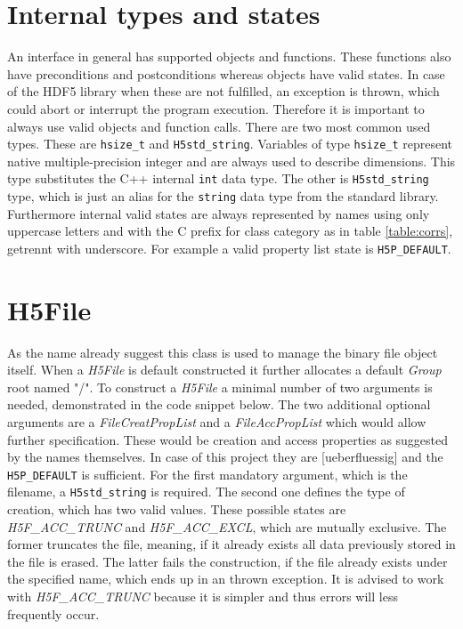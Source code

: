 \section{Internal types and states}
\label{seq:internaltypes}
An interface in general has supported objects and functions. These functions also have preconditions and postconditions whereas objects have valid states. In case of the HDF5 library when these are not fulfilled, an exception is thrown, which could abort or interrupt the program execution. Therefore it is important to always use valid objects and function calls. There are two most common used types. These are \texttt{hsize\_t} and \texttt{H5std\_string}. Variables of type \texttt{hsize\_t} represent native multiple-precision integer and are always used to describe dimensions. This type substitutes the C++ internal \texttt{int} data type. The other is \texttt{H5std\_string} type, which is just an alias for the \texttt{string} data type from the standard library. Furthermore internal valid states are always represented by names using only uppercase letters and with the C prefix for class category as in table \ref{table:corrs}, getrennt with underscore. For example a valid property list state is \texttt{H5P\_DEFAULT}.

\section{H5File}
\label{seq:h5file}
As the name already suggest this class is used to manage the binary file object itself. When a \textit{H5File} is default constructed it further allocates a default \textit{Group} root named "/". To construct a \textit{H5File} a minimal number of two arguments is needed, demonstrated in the code snippet below. The two additional optional arguments are a \textit{FileCreatPropList} and a \textit{FileAccPropList} which would allow further specification. These would be creation and access properties as suggested by the names themselves. In case of this project they are [ueberfluessig] and the \texttt{H5P\_DEFAULT} is sufficient. For the first mandatory argument, which is the filename, a \texttt{H5std\_string} is required. The second one defines the type of creation, which has two valid values. These possible states are \textit{H5F\_ACC\_TRUNC} and \textit{H5F\_ACC\_EXCL}, which are mutually exclusive. The former truncates the file, meaning, if it already exists all data previously stored in the file is erased. The latter fails the construction, if the file already exists under the specified name, which ends up in an thrown exception. It is advised to work with \textit{H5F\_ACC\_TRUNC} because it is simpler and thus errors will less frequently occur.

